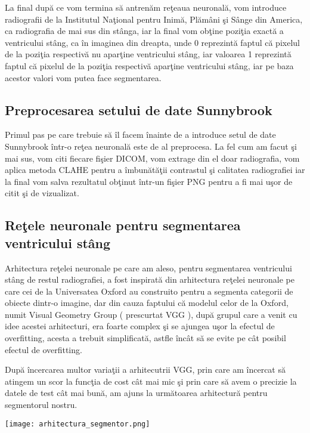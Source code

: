 \par

La final dup\u{a} ce vom termina s\u{a} antren\u{a}m re\c{t}eaua neuronal\u{a}, vom introduce radiografii de la Institutul Na\c{t}ional pentru Inim\u{a}, Pl\u{a}m\^{a}ni \c{s}i S\^{a}nge din America, ca radiografia de mai sus din st\^{a}nga, iar la final vom ob\c{t}ine pozi\c{t}ia exact\u{a} a ventricului st\^{a}ng, ca \^{i}n imaginea din dreapta, unde 0 reprezint\u{a} faptul c\u{a} pixelul de la pozi\c{t}ia respectiv\u{a} nu apar\c{t}ine ventricului st\^{a}ng, iar valoarea 1 reprezint\u{a} faptul c\u{a} pixelul de la pozi\c{t}ia respectiv\u{a} apar\c{t}ine ventricului st\^{a}ng, iar pe baza acestor valori vom putea face segmentarea.

\subsection{Preprocesarea setului de date Sunnybrook}

Primul pas pe care trebuie s\u{a} \^{i}l facem \^{i}nainte de a introduce setul de date Sunnybrook \^{i}ntr-o re\c{t}ea neuronal\u{a} este de al preprocesa. La fel cum am facut \c{s}i mai sus, vom citi fiecare fi\c{s}ier DICOM, vom extrage din el doar radiografia, vom aplica metoda CLAHE pentru a \^{i}mbun\u{a}t\u{a}\c{t}ii contrastul \c{s}i calitatea radiografiei iar la final vom salva rezultatul ob\c{t}inut \^{i}ntr-un fi\c{s}ier PNG pentru a fi mai u\c{s}or de citit \c{s}i de vizualizat.

\subsection{Re\c{t}ele neuronale pentru segmentarea ventricului st\^{a}ng}

Arhitectura re\c{t}elei neuronale pe care am aleso, pentru segmentarea ventricului st\^{a}ng de restul radiografiei, a fost inspirat\u{a} din arhitectura re\c{t}elei neuronale pe care cei de la Universatea Oxford au construito pentru a segmenta categorii de obiecte dintr-o imagine, dar din cauza faptului c\u{a} modelul celor de la Oxford, numit Visual Geometry Group ( prescurtat VGG ), dup\u{a} grupul care a venit cu idee acestei arhitecturi, era foarte complex \c{s}i se ajungea u\c{s}or la efectul de overfitting, acesta a trebuit simplificat\u{a,} astfle \^{i}nc\^{a}t s\u{a} se evite pe c\^{a}t posibil efectul de overfitting.

\par

Dup\u{a} \^{i}ncercarea multor varia\c{t}ii a arhitecutrii VGG, prin care am \^{i}ncercat s\u{a} atingem un scor la func\c{t}ia de cost c\^{a}t mai mic \c{s}i prin care s\u{a} avem o precizie la datele de test c\^{a}t mai bun\u{a}, am ajuns la urm\u{a}toarea arhitectur\u{a} pentru segmentorul nostru.

\begin{center}
\texttt{[image: arhitectura\_segmentor.png]}
\end{center}